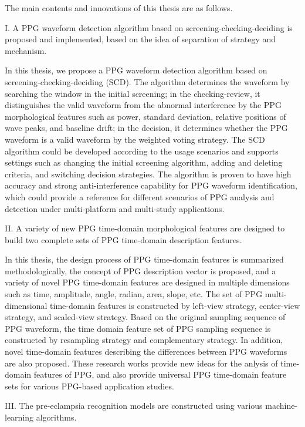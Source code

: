 The main contents and innovations of this thesis are as follows.

I. A PPG waveform detection algorithm based on screening-checking-deciding is proposed and implemented, based on the idea of separation of strategy and mechanism.

In this thesis, we propose a PPG waveform detection algorithm based on screening-checking-deciding (SCD). The algorithm determines the waveform by searching the window 
in the initial screening; in the checking-review, it distinguishes the valid waveform from the abnormal interference by the PPG morphological features such as power, standard deviation, 
relative positions of wave peaks, and baseline drift; in the decision, it determines whether the PPG waveform is a valid waveform by the weighted voting strategy. 
The SCD algorithm could be developed according to the usage scenarios and supports settings such as changing the initial screening algorithm, adding and deleting criteria, 
and switching decision strategies. The algorithm is proven to have high accuracy and strong anti-interference capability for PPG waveform identification, 
which could provide a reference for different scenarios of PPG analysis and detection under multi-platform and multi-study applications.

II. A variety of new PPG time-domain morphological features are designed to build two complete sets of PPG time-domain description features.

In this thesis, the design process of PPG time-domain features is summarized methodologically, the concept of PPG description vector is proposed, 
and a variety of novel PPG time-domain features are designed in multiple dimensions such as time, amplitude, angle, radian, area, slope, etc. 
The set of PPG multi-dimensional time-domain features is constructed by left-view strategy, center-view strategy, and scaled-view strategy. 
Based on the original sampling sequence of PPG waveform, the time domain feature set of PPG sampling sequence is constructed by resampling strategy and 
complementary strategy. In addition, novel time-domain features describing the differences between PPG waveforms are also proposed. 
These research works provide new ideas for the anlysis of time-domain features of PPG, and also provide universal PPG time-domain feature sets for various PPG-based application studies.

III. The pre-eclampsia recognition models are constructed using various machine-learning algorithms.

